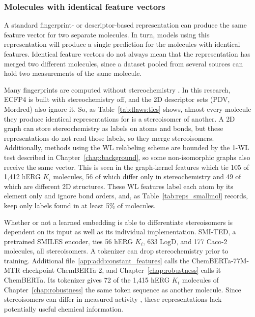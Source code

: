 \subsubsection{Molecules with identical feature vectors}\label{sec:flaws:ties}

A standard fingerprint- or descriptor-based representation can produce the same feature vector for two separate molecules. In turn, models using this representation will produce a single prediction for the molecules with identical features. Identical feature vectors do not always mean that the representation has merged two different molecules, since a dataset pooled from several sources can hold two measurements of the same molecule.

Many fingerprints are computed without stereochemistry \citep{orsi2024map4c}. In this research, ECFP4 is built with stereochemistry off, and the 2D descriptor sets (PDV, Mordred) also ignore it. So, as Table~\ref{tab:flaws:ties} shows, almost every molecule they produce identical representations for is a stereoisomer of another. A 2D graph can store stereochemistry as labels on atoms and bonds, but these representations do not read those labels, so they merge stereoisomers. Additionally, methods using the WL relabeling scheme are bounded by the 1-WL test described in Chapter~\ref{chap:background}, so some non-isomorphic graphs also receive the same vector. This is seen in the graph-kernel features which tie 105 of 1,412 hERG $K_i$ molecules, 56 of which differ only in stereochemistry and 49 of which are different 2D structures. These WL features label each atom by its element only and ignore bond orders, and, as Table~\ref{tab:reps_smallmol} records, keep only labels found in at least 5\% of molecules. 

Whether or not a learned embedding is able to differentiate stereoisomers is dependent on its input as well as its individual implementation. SMI-TED, a pretrained SMILES encoder, ties 56 hERG $K_i$, 633 LogD, and 177 Caco-2 molecules, all stereoisomers. A tokenizer can drop stereochemistry prior to training. Additional file~\ref{app:add:constant_features} calls the ChemBERTa-77M-MTR checkpoint ChemBERTa-2, and Chapter~\ref{chap:robustness} calls it ChemBERTa. Its tokenizer gives 72 of the 1,415 hERG $K_i$ molecules of Chapter~\ref{chap:robustness} the same token sequence as another molecule. Since stereoisomers can differ in measured activity \citep{Nguyen2006}, these representations lack potentially useful chemical information. 


